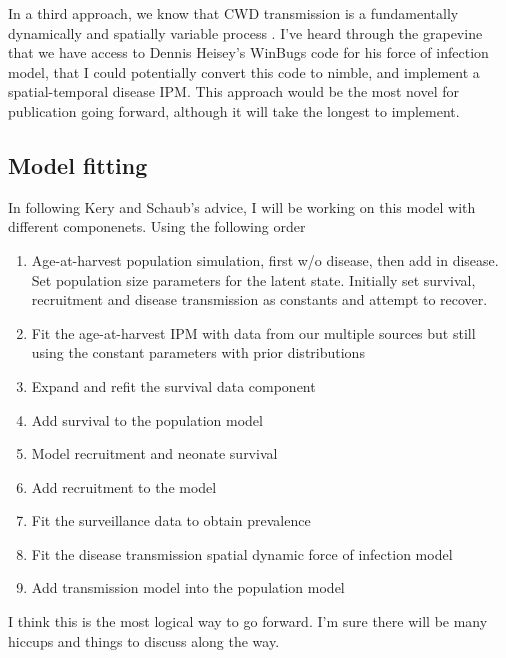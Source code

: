 \documentclass[12pt]{article}\usepackage[]{graphicx}\usepackage[]{color}
\begin{document}
In a third approach, we know that CWD transmission is a fundamentally dynamically and spatially variable process \citep{heisey2010, joly2006, osnas2009, ruiz2013}. I've heard through the grapevine that we have access to Dennis Heisey's WinBugs code for his force of infection model, that I could potentially
convert this code to nimble, and implement a spatial-temporal disease IPM. This approach would be the most novel for publication going forward, although it will take the longest to implement.

\newpage
\subsection{Model fitting}

In following Kery and Schaub's advice, I will be working on this model with different componenets. Using the following order
\begin{enumerate}
\item Age-at-harvest population simulation, first w/o disease, then add in disease. Set population size parameters for the latent state. Initially set survival, recruitment and disease transmission as constants and attempt to recover.
\item Fit the age-at-harvest IPM with data from our multiple sources but still using the constant parameters with prior distributions
\item Expand and refit the survival data component
\item Add survival to the population model
\item Model recruitment and neonate survival
\item Add recruitment to the model
\item Fit the surveillance data to obtain prevalence
\item Fit the disease transmission spatial dynamic force of infection model
\item Add transmission model into the population model
\end{enumerate}

I think this is the most logical way to go forward. I'm sure there will be many hiccups and things to discuss along the way.



% 
% 
\end{document}
